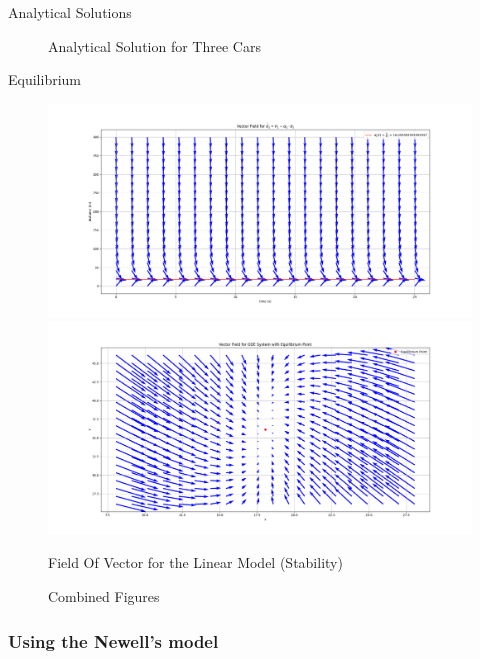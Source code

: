 \documentclass{beamer}
\begin{document}
\begin{frame}{Analytical Solutions}
\begin{figure}[H]
\begin{minipage}[t]{0.49\linewidth}
			\caption{Analytical Solution for Three Cars}
			\label{fig:AnalyticalSolution}
		\end{minipage}\hfill
		\label{fig:CombinedFigures}
	\end{figure}
\end{frame}

\begin{frame}{Equilibrium}
	\begin{figure}[H]
		\centering
		\begin{minipage}[t]{0.49\textwidth}
			\centering
			\includegraphics[width=\linewidth]{FieldOfVector_CV.png}
		\end{minipage}
		\hfill 
		\begin{minipage}[t]{0.49\textwidth}
			\centering
			\includegraphics[width=\linewidth]{FieldOfVector_CV2.png}
			\caption{Field Of Vector for the Linear Model (Stability)}
			\label{fig:FV1}
		\end{minipage}
		\caption{Combined Figures}
		\label{fig:CombinedFigures}
	\end{figure}
\end{frame}



\subsubsection{Using the Newell's model}
\end{document}
